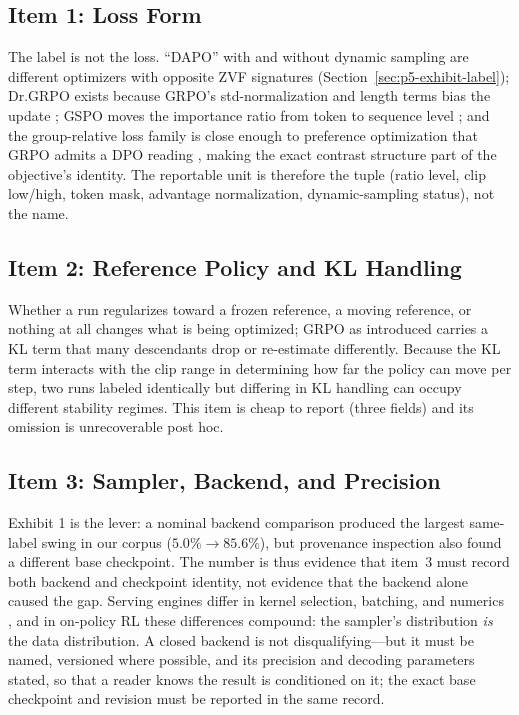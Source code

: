 \documentclass{article}  \usepackage[preprint,nonatbib]{neurips_2026} \usepackage[numbers]{natbib}
\providecommand{\secref}[1]{Section~\ref{#1}}
\begin{document}
\subsection{Item 1: Loss Form}
\label{sec:p5-item1}
The label is not the loss. ``DAPO'' with and without dynamic sampling are
different optimizers with opposite ZVF signatures
(\secref{sec:p5-exhibit-label}); Dr.GRPO exists because GRPO's
std-normalization and length terms bias the update \citep{tong2025drgrpo};
GSPO moves the importance ratio from token to sequence level
\citep{qwen2025gspo}; and the group-relative loss family is close enough to
preference optimization that GRPO admits a DPO reading
\citep{rafailov2024direct, wu2025grpo_dpo}, making the exact contrast structure
part of the objective's identity. The reportable unit is therefore the tuple
(ratio level, clip low/high, token mask, advantage normalization,
dynamic-sampling status), not the name.

\subsection{Item 2: Reference Policy and KL Handling}
\label{sec:p5-item2}
Whether a run regularizes toward a frozen reference, a moving reference, or
nothing at all changes what is being optimized; GRPO as introduced carries a
KL term \citep{shao2024deepseekmath} that many descendants drop or re-estimate
differently. Because the KL term interacts with the clip range in determining
how far the policy can move per step, two runs labeled identically but
differing in KL handling can occupy different stability regimes. This item is
cheap to report (three fields) and its omission is unrecoverable post hoc.

\subsection{Item 3: Sampler, Backend, and Precision}
\label{sec:p5-item3}
Exhibit 1 is the lever: a nominal backend comparison produced the largest
same-label swing in our corpus ($5.0\% \to 85.6\%$), but provenance inspection
also found a different base checkpoint. The number is thus evidence that item~3
must record both backend and checkpoint identity, not evidence that the backend
alone caused the gap. Serving engines differ in kernel
selection, batching, and numerics \citep{kwon2023vllm, zheng2024sglang,
dao2022flashattention}, and in on-policy RL these differences compound: the
sampler's distribution \emph{is} the data distribution. A closed backend is
not disqualifying---but it must be named, versioned where possible, and its
precision and decoding parameters stated, so that a reader knows the result is
conditioned on it; the exact base checkpoint and revision must be reported in
the same record.
\end{document}
